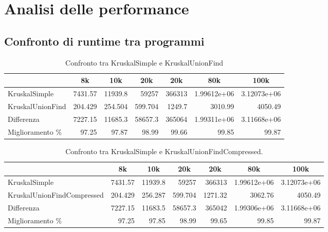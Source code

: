 \section{Analisi delle performance}
\label{cap:performance-analysis}

\subsection{Confronto di runtime tra programmi}

\begin{table}[H]
\centering
    \begin{tabular}{|l|rrrrrr|}
    \hline
    &  \multicolumn{1}{c}{8k} & \multicolumn{1}{c}{10k} & \multicolumn{1}{c}{20k} & \multicolumn{1}{c}{20k} & \multicolumn{1}{c}{80k} &           \multicolumn{1}{c|}{100k} \\
    \hline
     KruskalSimple     & 7431.57  & 11939.8   & 59257     & 366313    &    1.99612e+06 &    3.12073e+06 \\
     KruskalUnionFind &  204.429 &   254.504 &   599.704 &   1249.7  & 3010.99        & 4050.49        \\ \hline
     Differenza       & 7227.15  & 11685.3   & 58657.3   & 365064    &    1.99311e+06 &    3.11668e+06 \\
     Miglioramento \%    &   97.25  &    97.87  &    98.99  &     99.66 &   99.85        &   99.87        \\
    \hline
    \end{tabular}
    \caption{Confronto tra KruskalSimple e KruskalUnionFind}
    \label{table:kruskal-simple-vs-kruskal-union-find}
\end{table}


\begin{table}[H]
\centering
    \hspace*{-1cm}
    \begin{tabular}{|l|rrrrrr|}
    \hline
    &  \multicolumn{1}{c}{8k} & \multicolumn{1}{c}{10k} & \multicolumn{1}{c}{20k} & \multicolumn{1}{c}{20k} & \multicolumn{1}{c}{80k} &           \multicolumn{1}{c|}{100k} \\
    \hline
     KruskalSimple               & 7431.57  & 11939.8   & 59257     & 366313    &    1.99612e+06 &    3.12073e+06 \\
     KruskalUnionFindCompressed &  204.429 &   256.287 &   599.704 &   1271.32 & 3062.76        & 4050.49        \\ \hline
     Differenza                 & 7227.15  & 11683.5   & 58657.3   & 365042    &    1.99306e+06 &    3.11668e+06 \\
     Miglioramento \%              &   97.25  &    97.85  &    98.99  &     99.65 &   99.85        &   99.87        \\
    \hline
    \end{tabular}
    \caption{Confronto tra KruskalSimple e KruskalUnionFindCompressed.}
    \label{table:kruskal-simple-vs-kruskal-union-find-compressed}
\end{table}

